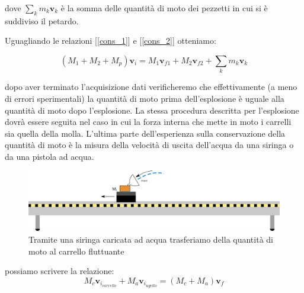 \documentclass[a4paper,10pt,oneside]{article}
\begin{document}
dove $\sum_km_k\mathbf{v}_k$ è la somma delle quantità di moto dei pezzetti in cui si è suddiviso il petardo.


Uguagliando le relazioni [\ref{cons_1}] e [\ref{cons_2}] otteniamo:


\begin{equation}\label{lab_cons}
  (M_1+M_2+M_p)\mathbf{v}_i=M_1\mathbf{v}_{f1}+M_2\mathbf{v}_{f2}+\sum_km_k\mathbf{v}_k
\end{equation}

dopo aver terminato l'acquisizione dati verificheremo che effettivamente (a meno di errori sperimentali) la quantità di moto prima dell'esplosione è uguale alla quantità di moto dopo l'esplosione. La stessa procedura descritta per l'esplosione dovrà essere seguita nel caso in cui la forza interna che mette in moto i carrelli sia quella della molla.
L'ultima parte dell'esperienza sulla conservazione della quantità di moto è la misura della velocità di uscita dell'acqua da una siringa o da una pistola ad acqua. 
\begin{figure}[H]
 \centering
 \includegraphics[width=\textwidth]{./Immagini/imbuto.png}
 \caption{Tramite una siringa caricata ad acqua trasferiamo della quantità di moto al carrello fluttuante}
 \label{fig:imbuto}
\end{figure}
possiamo scrivere la relazione:
\begin{equation}
 M_c\mathbf{v}_{i_{carrello}}+M_a\mathbf{v}_{i_{ugello}}=(M_c+M_a)\mathbf{v}_f
\end{equation}
\end{document}
